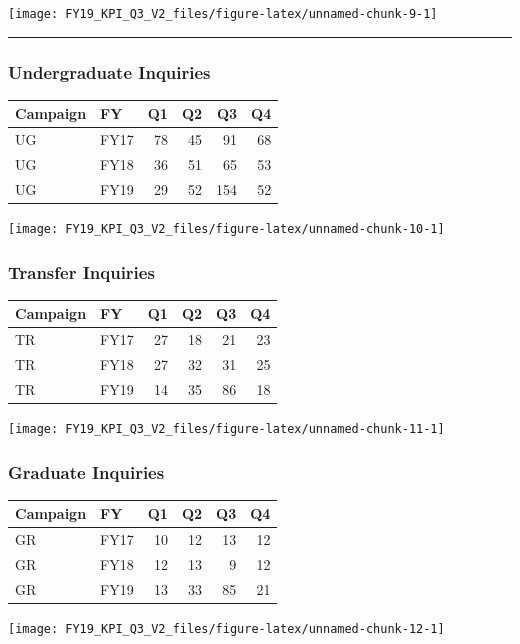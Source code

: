 \documentclass[]{tufte-handout}
\begin{document}
\texttt{[image: FY19\_KPI\_Q3\_V2\_files/figure-latex/unnamed-chunk-9-1]}

\begin{center}\rule{0.5\linewidth}{\linethickness}\end{center}

\subsubsection{Undergraduate Inquiries}\label{undergraduate-inquiries}

\begin{longtable}[]{@{}llrrrr@{}}
\toprule
Campaign & FY & Q1 & Q2 & Q3 & Q4\tabularnewline
\midrule
\endhead
UG & FY17 & 78 & 45 & 91 & 68\tabularnewline
UG & FY18 & 36 & 51 & 65 & 53\tabularnewline
UG & FY19 & 29 & 52 & 154 & 52\tabularnewline
\bottomrule
\end{longtable}

\texttt{[image: FY19\_KPI\_Q3\_V2\_files/figure-latex/unnamed-chunk-10-1]}

\subsubsection{Transfer Inquiries}\label{transfer-inquiries}

\begin{longtable}[]{@{}llrrrr@{}}
\toprule
Campaign & FY & Q1 & Q2 & Q3 & Q4\tabularnewline
\midrule
\endhead
TR & FY17 & 27 & 18 & 21 & 23\tabularnewline
TR & FY18 & 27 & 32 & 31 & 25\tabularnewline
TR & FY19 & 14 & 35 & 86 & 18\tabularnewline
\bottomrule
\end{longtable}

\texttt{[image: FY19\_KPI\_Q3\_V2\_files/figure-latex/unnamed-chunk-11-1]}

\subsubsection{Graduate Inquiries}\label{graduate-inquiries}

\begin{longtable}[]{@{}llrrrr@{}}
\toprule
Campaign & FY & Q1 & Q2 & Q3 & Q4\tabularnewline
\midrule
\endhead
GR & FY17 & 10 & 12 & 13 & 12\tabularnewline
GR & FY18 & 12 & 13 & 9 & 12\tabularnewline
GR & FY19 & 13 & 33 & 85 & 21\tabularnewline
\bottomrule
\end{longtable}

\texttt{[image: FY19\_KPI\_Q3\_V2\_files/figure-latex/unnamed-chunk-12-1]}
\end{document}
